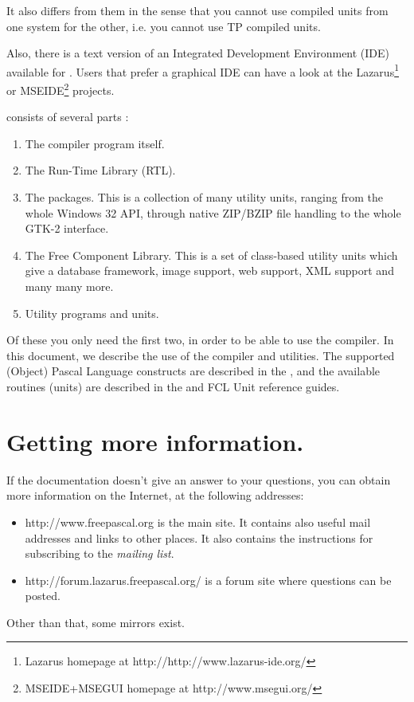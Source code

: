 It also differs from them in the sense that you cannot use compiled units
from one system for the other, i.e. you cannot use TP compiled units.

Also, there is a text version of an Integrated Development Environment (IDE)
available for \fpc. Users that prefer a graphical IDE can have a look at the
Lazarus\footnote{Lazarus homepage at http://http://www.lazarus-ide.org/ }
or MSEIDE\footnote{MSEIDE+MSEGUI homepage at http://www.msegui.org/ } projects.

\fpc consists of several parts :
\begin{enumerate}
\item The compiler program itself.
\item The Run-Time Library (RTL).
\item The packages. This is a collection of many utility units, ranging from
the whole Windows 32 API, through native ZIP/BZIP file handling to the whole GTK-2 interface.
\item The Free Component Library. This is a set of class-based utility units which give
a database framework, image support, web support, XML support and many many more.
\item Utility programs and units.
\end{enumerate}

Of these you only need the first two, in order to be able to use the compiler.
In this document, we describe the use of the compiler and utilities.
The supported (Object) Pascal Language constructs are described in the ,
and the available routines (units) are described in the \unitsref and FCL Unit reference guides.

\section{Getting more information.}
If the documentation doesn't give an answer to your questions,
you can obtain more information on the Internet, at the following addresses:
\begin{itemize}
\item
{}
{http://www.freepascal.org} is the main
site. It contains also useful mail addresses and
links to other places.
It also contains the instructions for subscribing to the
\textit{mailing list}.

\item
{}
{http://forum.lazarus.freepascal.org/} is a forum site where
questions can be posted.
\end{itemize}
Other than that, some mirrors exist.

